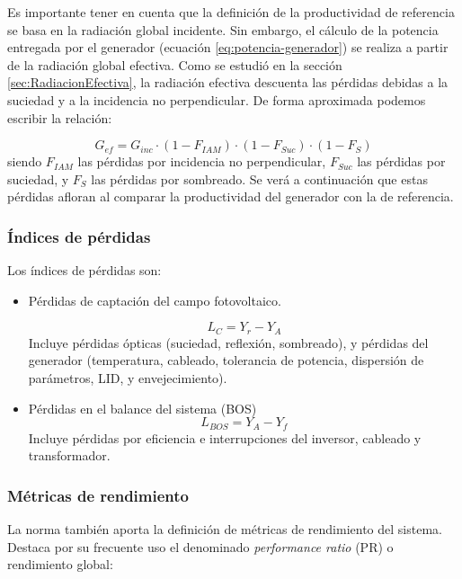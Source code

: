 Es importante tener en cuenta que la definición de la productividad de referencia se basa en la radiación global incidente. Sin embargo, el cálculo de la potencia entregada por el generador (ecuación \ref{eq:potencia-generador}) se realiza a partir de la radiación global efectiva. Como se estudió en la sección \ref{sec:RadiacionEfectiva}, la radiación efectiva descuenta las pérdidas debidas a la suciedad y a la incidencia no perpendicular. De forma aproximada podemos escribir la relación:

\begin{equation}
  \label{eq:ginc-gef}
  G_{ef} = G_{inc} \cdot (1- F_{IAM}) \cdot (1 - F_{Suc}) \cdot (1 - F_S)
\end{equation}
siendo $F_{IAM}$ las pérdidas por incidencia no perpendicular, $F_{Suc}$ las pérdidas por suciedad, y $F_{S}$ las pérdidas por sombreado. Se verá a continuación que estas pérdidas afloran al comparar la productividad del generador con la de referencia.

\subsubsection{Índices de pérdidas}

Los índices de pérdidas son:

\begin{itemize}
\item Pérdidas de captación del campo fotovoltaico.

  \begin{equation}
    \label{eq:lc}
    L_C = Y_r - Y_A
  \end{equation}
  Incluye pérdidas ópticas (suciedad, reflexión, sombreado), y
  pérdidas del generador (temperatura, cableado, tolerancia de
  potencia, dispersión de parámetros, LID, y envejecimiento).
  
\item Pérdidas en el balance del sistema (BOS)
  \begin{equation}
    \label{eq:lbox}
    L_{BOS} = Y_A - Y_f
  \end{equation}
  Incluye pérdidas por eficiencia e interrupciones del inversor, cableado y transformador.
\end{itemize}

\subsubsection{Métricas de rendimiento}

La norma también aporta la definición de métricas de rendimiento del sistema. Destaca por su frecuente uso el denominado \emph{performance ratio} (PR) o rendimiento global:

